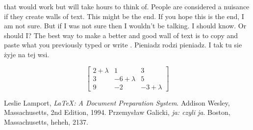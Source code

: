 \documentclass[11pt]{article}
\begin{document}
\begin{center}
that would work but will take hours to think of. People are considered a nuisance if they create walls of text. This might be the end. If you hope this is the end, I am not sure. But if I was not sure then I wouldn't be talking. I should know. Or should I? The best way to make a better and good wall of text is to copy and paste what you previously typed or write
.\cite{Galicki96} Pieniadz rodzi pieniadz. I tak tu sie żyje na tej wsi.
\end{center}
\newpage
$$\left[\begin{array}{ccc}
2+\lambda&1&3\\
3&-6+\lambda&5\\
9&-2&-3+\lambda
\end{array}\right]$$




\begin{thebibliography}{9}

  Leslie Lamport,
  \emph{\LaTeX: A Document Preparation System}.
  Addison Wesley, Massachusetts,
  2nd Edition,
  1994.
  Przemysław Galicki,
  \emph{ja: czyli ja}.
  Boston, Massachusetts,
  heheh,
  2137.

\end{thebibliography}
\end{document}
